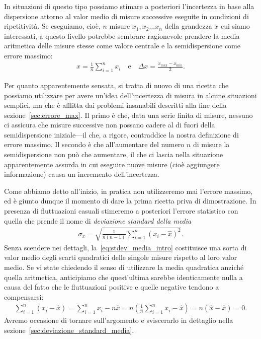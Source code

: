 In situazioni di questo tipo possiamo stimare a posteriori l'incertezza
in base alla dispersione attorno al valor medio di misure successive eseguite
in condizioni di ripetitività. Se eseguiamo, cioè, $n$ misure
$x_1, x_2 \ldots x_n$ della grandezza $x$ cui siamo interessati, a questo
livello potrebbe sembrare ragionevole prendere la media aritmetica delle misure
stesse come valore centrale e la semidispersione come errore massimo:
\begin{align}\label{eq:errore_max_fluttuazioni}
  \hat{x} = \frac{1}{n} \sum_{i = 1}^n x_i \quad \text{e} \quad
  \Delta x = \frac{x_{\max} - x_{\min}}{2}.
\end{align}

Per quanto apparentemente sensata, si tratta di nuovo di una ricetta che
possiamo utilizzare per avere un'idea dell'incertezza di misura in alcune
situazioni semplici, ma che è afflitta dai problemi insanabili descritti
alla fine della sezione~\ref{sec:errore_max}. Il primo è che, data una serie
finita di misure, nessuno ci assicura che misure successive non possano cadere
al di fuori della semidispersione iniziale---il che, a rigore, contraddice la
nostra definizione di errore massimo. Il secondo è che all'aumentare del
numero $n$ di misure la semidispersione non può che aumentare, il che ci
lascia nella situazione apparentemente assurda in cui eseguire nuove misure
(cioè aggiungere informazione) causa un incremento dell'incertezza.

Come abbiamo detto all'inizio, in pratica non utilizzeremo mai l'errore massimo,
ed è giunto dunque il momento di dare la prima ricetta priva di
dimostrazione. In presenza di fluttuazioni casuali stimeremo a posteriori
l'errore statistico con quella che prende il nome di
\emph{deviazione standard della media}
\begin{align}\label{eq:stdev_media_intro}
  \sigma_x = \sqrt{\frac{1}{n(n - 1)}\sum_{i = 1}^n (x_i - \hat{x})^2}.
\end{align}
Senza scendere nei dettagli, la~\eqref{eq:stdev_media_intro} costituisce una
sorta di valor medio degli scarti quadratici delle singole misure rispetto
al loro valor medio. Se vi state chiedendo il senso di utilizzare la media
quadratica anziché quella aritmetica, anticipiamo che quest'ultima sarebbe
identicamente nulla a causa del fatto che le fluttuazioni positive e quelle
negative tendono a compensarsi:
\begin{align*}
  \sum_{i = 1}^n (x_i - \hat{x}) = \sum_{i = 1}^n x_i - n \hat{x} =
  n \left( \frac{1}{n} \sum_{i = 1}^n x_i - \hat{x} \right) =
  n (\hat{x} - \hat{x}) = 0.
\end{align*}
Avremo occasione di tornare sull'argomento e sviscerarlo in dettaglio nella
sezione~\ref{sec:deviazione_standard_media}.

